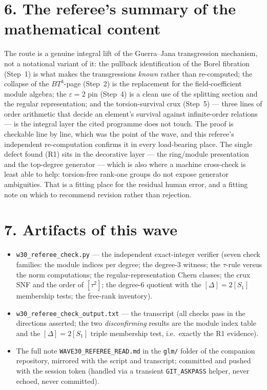 \documentclass[11pt,a4paper]{article}
\begin{document}
\section*{6. The referee's summary of the mathematical content}

The route is a genuine integral lift of the Guerra--Jana transgression
mechanism, not a notational variant of it: the pullback identification of the
Borel fibration (Step~1) is what makes the transgressions \emph{known}
rather than re-computed; the collapse of the $BT^3$-page (Step~2) is the
replacement for the field-coefficient module algebra; the $\varepsilon=2$ pin
(Step~4) is a clean use of the splitting section and the regular
representation; and the torsion-survival crux (Step~5) --- three lines of
order arithmetic that decide an element's survival against infinite-order
relations --- is the integral layer the cited programme does not touch. The
proof is checkable line by line, which was the point of the wave, and this
referee's independent re-computation confirms it in every load-bearing
place. The single defect found (R1) sits in the decorative layer --- the
ring/module presentation and the top-degree generator --- which is also
where a machine cross-check is least able to help: torsion-free rank-one
groups do not expose generator ambiguities. That is a fitting place for the
residual human error, and a fitting note on which to recommend revision
rather than rejection.

\section*{7. Artifacts of this wave}

\begin{itemize}[leftmargin=1.4em,itemsep=2pt]
\item \texttt{w30\_referee\_check.py} --- the independent exact-integer
verifier (seven check families: the module indices per degree; the degree-3
witness; the $\tau$-rule versus the norm computations; the
regular-representation Chern classes; the crux SNF and the order of
$[\tau^2]$; the degree-6 quotient with the $[\Delta]=2[S_1]$ membership
tests; the free-rank inventory).
\item \texttt{w30\_referee\_check\_output.txt} --- the transcript (all checks
pass in the directions asserted; the two \emph{disconfirming} results are the
module index table and the $[\Delta]=2[S_1]$ triple membership test, i.e.\
exactly the R1 evidence).
\item The full note \texttt{WAVE30\_REFEREE\_READ.md} in the \texttt{glm/}
folder of the companion repository, mirrored with the script and transcript;
committed and pushed with the session token (handled via a transient
\texttt{GIT\_ASKPASS} helper, never echoed, never committed).
\end{itemize}
\end{document}
